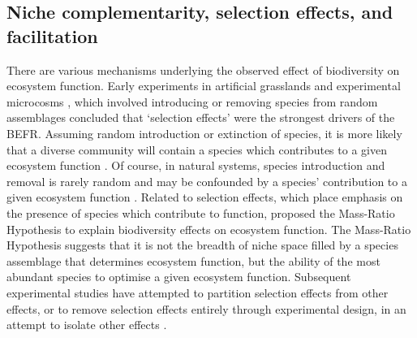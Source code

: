 \begin{refsection}
\subsection{Niche complementarity, selection effects, and facilitation}
\label{background:ssec:niche}

There are various mechanisms underlying the observed effect of biodiversity on ecosystem function. Early experiments in artificial grasslands \citep{Tilman1994} and experimental microcosms \citep{Naeem1994}, which involved introducing or removing species from random assemblages concluded that `selection effects' were the strongest drivers of the BEFR. Assuming random introduction or extinction of species, it is more likely that a diverse community will contain a species which contributes to a given ecosystem function \citep{Huston1997}. Of course, in natural systems, species introduction and removal is rarely random and may be confounded by a species' contribution to a given ecosystem function \citep{Smith2003}. Related to selection effects, which place emphasis on the presence of species which contribute to function, \citet{Grime1998} proposed the Mass-Ratio Hypothesis to explain biodiversity effects on ecosystem function. The Mass-Ratio Hypothesis suggests that it is not the breadth of niche space filled by a species assemblage that determines ecosystem function, but the ability of the most abundant species to optimise a given ecosystem function. Subsequent experimental studies have attempted to partition selection effects from other effects, or to remove selection effects entirely through experimental design, in an attempt to isolate other effects \citep{Loreau2001a}.


\end{refsection}
